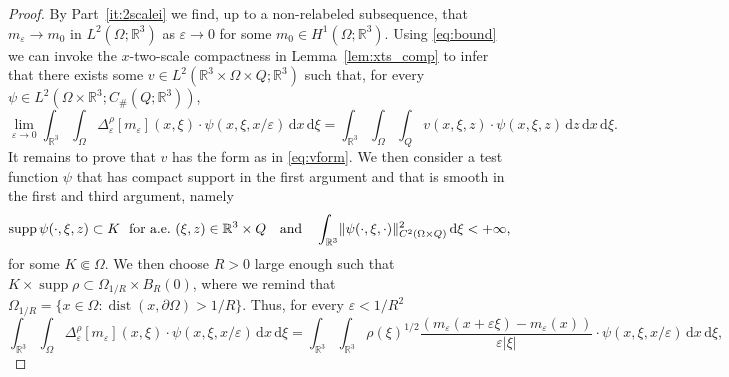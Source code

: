 \documentclass[reqno,11pt]{amsart}
\numberwithin{equation}{section}
\theoremstyle{thmlemcorr}
\numberwithin{theorem}{section}
\theoremstyle{thmlemcorr*}
\theoremstyle{defi}
\theoremstyle{remexample}
\theoremstyle{ass}
\newcommand{\R}{\mathbb{R}}
\renewcommand{\epsilon}{\varepsilon}
\newcommand{\dd}{\,\mathrm{d}}
\DeclarePairedDelimiter{\norm}{\lVert}{\rVert}
\newcommand{\1}{\mathds{1}}
\DeclareMathOperator{\supp}{supp}
\newcommand{\Om}{\Omega}
\newcommand{\veps}{\varepsilon}
\newcommand{\dl}{\,\mathrm{d}}
\begin{document}
\begin{proof}
    By Part~\ref{it:2scalei} we find, up to a non-relabeled subsequence, that $m_\epsilon \to m_0$ in $L^2(\Omega;\R^3)$ as $\varepsilon \to 0$ for some $m_0 \in H^1(\Omega;\R^3)$. Using \eqref{eq:bound} we can invoke the $x$-two-scale compactness in Lemma~\ref{lem:xts_comp} to infer that there exists some $v \in L^2(\R^3 \times \Omega \times Q;\R^3)$ such that, for every $\psi \in L^2(\Omega \times \R^3;C_{\#}(Q;\R^3))$,
    \begin{equation}\label{eq:twoscalelimit}
    \lim_{\epsilon \to 0} \int_{\R^3}\int_{\Omega} \Delta_\epsilon^\rho[m_\veps](x,\xi) \cdot \psi(x,\xi,x/\epsilon)\dd x\dd \xi = \int_{\R^3}\int_{\Omega}\int_{Q}v(x,\xi,z) \cdot \psi(x,\xi,z)\dd z\dd x \dd \xi.
    \end{equation}    
    It remains to prove that $v$ has the form as in \eqref{eq:vform}. We then consider a test function $\psi$ that has compact support in the first argument and that is smooth in the first and third argument, namely 
    \begin{equation}\label{eq:smoothpsi}
        \supp \psi(\cdot,\xi,z) \subset K %
        \ \ \text{for a.e.~$(\xi,z) \in \R^3 \times Q$} \quad \text{and} \quad \int_{\R^3}\norm{\psi(\cdot,\xi,\cdot)}_{C^2(\Omega \times Q)}^2\dd \xi <+ \infty,
    \end{equation}
    for some $K \Subset \Omega$. 
    We then choose $R>0$ large enough such that $K \times \supp \rho \subset \Omega_{1/R} \times B_R(0)$, where we remind that $\Omega_{1/R}  = \{ x \in \Omega : \operatorname{dist}(x, \partial \Om) > 1/R\} $. Thus, for every $\epsilon <1/R^2$
    \begin{equation}\label{eq:mid-term}
    \int_{\R^3}\int_{\Omega} \Delta_\epsilon^\rho[m_\veps](x,\xi) \cdot \psi(x,\xi,x/\epsilon)\dd x\dd \xi = \int_{\R^3}\int_{\R^3} \rho(\xi)^{1/2}\frac{(m_\epsilon(x+\epsilon\xi)-m_\epsilon(x))}{\epsilon|\xi|} \cdot \psi(x,\xi,x/\epsilon)\dd x\dd \xi,

\end{equation}
\end{proof}
\end{document}
